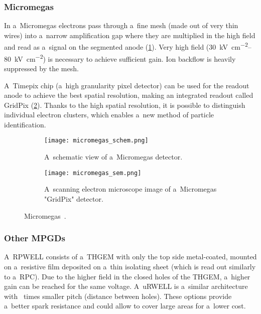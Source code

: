 			\subsubsection{Micromegas}
				In a~\ac{Micromegas} electrons pass through a~fine mesh (made out of very thin wires) into a~narrow amplification gap where they are multiplied in the high field and read as a~signal on the segmented anode (\cref{fig:micromegas_schem}). Very high field (\qtyrange{30}{80}{\kV\per\cm\squared}) is necessary to achieve sufficient gain. Ion backflow is heavily suppressed by the mesh. 
				
				A~Timepix chip (a~high granularity pixel detector) can be used for the readout anode to achieve the best spatial resolution, making an integrated readout called GridPix (\cref{fig:micromegas_sem}). Thanks to the high spatial resolution, it is possible to distinguish individual electron clusters, which enables a~new method of particle identification.
				
				\begin{figure}
					\centering
					\begin{subfigure}[t]{0.54\textwidth}
						\centering
						\texttt{[image: micromegas\_schem.png]}
						\caption{A~schematic view of a~\ac{Micromegas} detector.}
						\label{fig:micromegas_schem}
					\end{subfigure}
					\hfill
					\begin{subfigure}[t]{0.44\textwidth}
						\centering
						\texttt{[image: micromegas\_sem.png]}
						\caption{A~scanning electron microscope image of a~\ac{Micromegas} "GridPix" detector.}
						\label{fig:micromegas_sem}
					\end{subfigure}
					\caption{\acf{Micromegas}~\cite{pdg2024}.}
					\label{fig:micromegas}
				\end{figure}
			
			\subsubsection{Other MPGDs}
				A~\ac{RPWELL} consists of a~\ac{THGEM} with only the top side metal-coated, mounted on a~resistive film deposited on a~thin isolating sheet (which is read out similarly to a~\ac{RPC}). Due to the higher field in the closed holes of the \ac{THGEM}, a~higher gain can be reached for the same voltage. A~\ac{uRWELL} is a~similar architecture with ~times smaller pitch (distance between holes). These options provide a~better spark resistance and could allow to cover large areas for a~lower cost.
				
